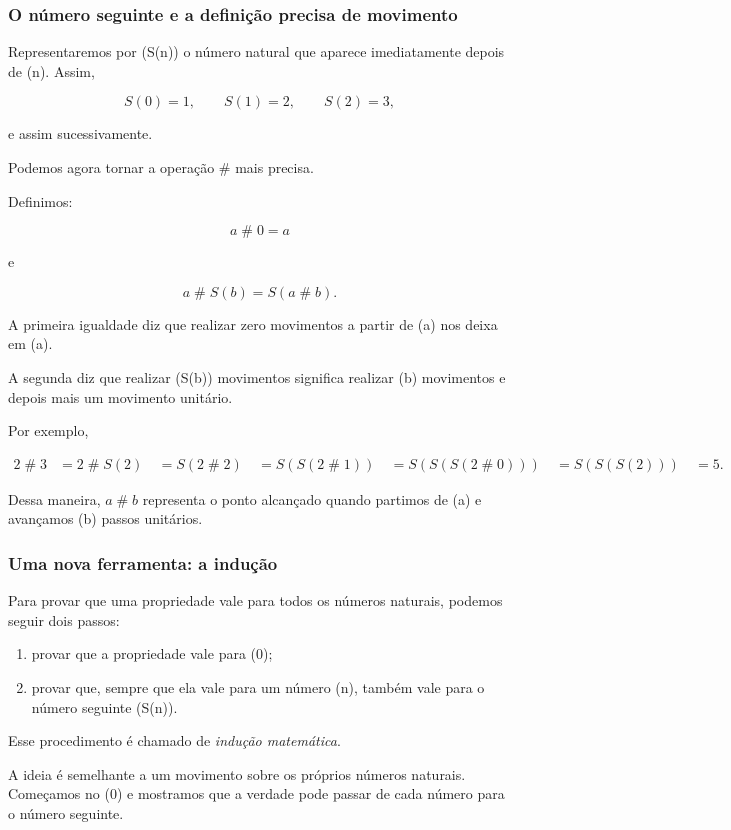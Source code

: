 \documentclass[12pt,a4paper]{article}
\newcommand{\mov}{\mathbin{\#}}
\begin{document}
\subsubsection{O número seguinte e a definição precisa de movimento}

Representaremos por (S(n)) o número natural que aparece imediatamente
depois de (n). Assim,

\[
S(0)=1,\qquad S(1)=2,\qquad S(2)=3,
\]

e assim sucessivamente.

Podemos agora tornar a operação $\mov$ mais precisa.

Definimos:

\[
a\mov0=a
\]

e

\[
a\mov S(b)=S(a\mov b).
\]

A primeira igualdade diz que realizar zero movimentos a partir de (a)
nos deixa em (a).

A segunda diz que realizar (S(b)) movimentos significa realizar (b)
movimentos e depois mais um movimento unitário.

Por exemplo,

\[
\begin{aligned}
2\mov3
&=2\mov S(2)\
&=S(2\mov2)\
&=S(S(2\mov1))\
&=S(S(S(2\mov0)))\
&=S(S(S(2)))\
&=5.
\end{aligned}
\]

Dessa maneira, $a\mov b$ representa o ponto alcançado quando partimos
de (a) e avançamos (b) passos unitários.

\subsubsection{Uma nova ferramenta: a indução}

Para provar que uma propriedade vale para todos os números naturais,
podemos seguir dois passos:

\begin{enumerate}
\item provar que a propriedade vale para (0);
\item provar que, sempre que ela vale para um número (n), também
vale para o número seguinte (S(n)).
\end{enumerate}

Esse procedimento é chamado de \emph{indução matemática}.

A ideia é semelhante a um movimento sobre os próprios números naturais.
Começamos no (0) e mostramos que a verdade pode passar de cada número
para o número seguinte.
\end{document}
